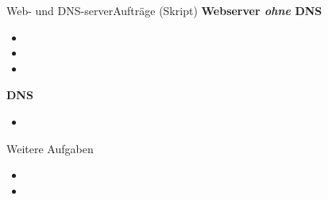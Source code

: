 \begin{frame}[fragile]{Web- und \gls{DNS}-server}{Aufträge (Skript)}
    \textbf{Webserver \textit{ohne} \gls{DNS}}
    \begin{itemize}
        \item {}
        \item {}
        \item {}
    \end{itemize}
    \textbf{\gls{DNS}}
    \begin{itemize}
        \item {}
    \end{itemize}

    Weitere Aufgaben
    \begin{itemize}
        \item {}
        \item {}
    \end{itemize}
\end{frame}